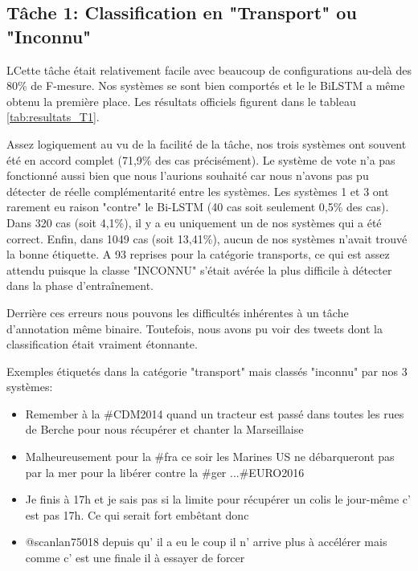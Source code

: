 \label{sec:resultats}

\subsection{Tâche 1: Classification en "Transport" ou "Inconnu"}

 LCette tâche était relativement facile avec beaucoup de configurations au-delà des 80\% de F-mesure.
 Nos systèmes se sont bien comportés et le le BiLSTM a même obtenu la première place. Les résultats officiels figurent dans le tableau \ref{tab:resultats_T1}.


Assez logiquement au vu de la facilité de la tâche, nos trois systèmes ont souvent été en accord complet (71,9\% des cas précisément).
Le système de vote n'a pas fonctionné aussi bien que nous l'aurions souhaité car nous n'avons pas pu détecter de réelle complémentarité entre les systèmes.
 Les systèmes 1 et 3 ont rarement eu raison "contre" le Bi-LSTM (40 cas soit seulement 0,5\% des cas). 
 Dans 320 cas (soit 4,1\%), il y a eu uniquement un de nos systèmes qui a été correct.
Enfin, dans 1049 cas (soit 13,41\%), aucun de nos systèmes n'avait trouvé la bonne étiquette. A 93 reprises pour la catégorie transports, ce qui est assez attendu puisque la classe "INCONNU" s'était avérée la plus difficile à détecter dans la phase d'entraînement.

Derrière ces erreurs nous pouvons les difficultés inhérentes à un tâche d'annotation même binaire. Toutefois, nous avons pu voir des tweets dont la classification était vraiment étonnante.

Exemples étiquetés dans la catégorie "transport" mais classés "inconnu" par nos 3 systèmes:
\begin{itemize}
\item Remember à la \#CDM2014 quand un tracteur est passé dans toutes les rues de Berche pour nous récupérer et chanter la Marseillaise
 \item Malheureusement pour la \#fra ce soir les Marines US ne débarqueront pas par la mer pour la libérer contre la \#ger ...\#EURO2016
 \item Je finis à 17h et je sais pas si la limite pour récupérer un colis le jour-même c' est pas 17h. Ce qui serait fort embêtant donc 
 \item @scanlan75018 depuis qu' il a eu le coup il n' arrive plus à accélérer mais comme c' est une finale il à essayer de forcer
\end{itemize}

